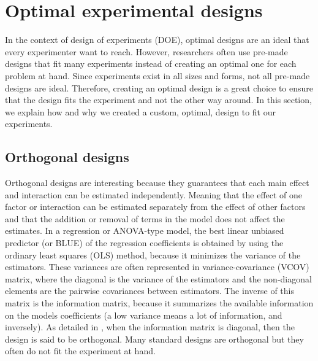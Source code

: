 
\section{Optimal experimental designs}
In the context of design of experiments (DOE), optimal designs are an ideal that every experimenter want to reach. However, researchers often use pre-made designs that fit many experiments instead of creating an optimal one for each problem at hand. Since experiments exist in all sizes and forms, not all pre-made designs are ideal. Therefore, creating an optimal design is a great choice to ensure that the design fits the experiment and not the other way around. In this section, we explain how and why we created a custom, optimal, design to fit our experiments.

\subsection{Orthogonal designs}
Orthogonal designs are interesting because they guarantees that each main effect and interaction can 
be estimated independently. Meaning that the effect of one factor or interaction can be estimated separately from the effect of 
other factors
and that the addition or removal of terms in the model does not affect the estimates.
In a regression or ANOVA-type model, the best linear unbiased predictor (or BLUE) of the regression coefficients is obtained by 
using 
the ordinary least squares (OLS) method, because it minimizes the variance of the estimators. 
These variances are often represented in variance-covariance (VCOV) matrix, 
where the diagonal is the variance of the estimators and the non-diagonal elements are the pairwise covariances between 
estimators. 
The inverse of this matrix is the information matrix, 
because it summarizes the available information  on the models coefficients (a low variance means a lot of information, and 
inversely).
As detailed in \textcite{goos_optimal_2011}, when the information matrix is diagonal, then the design is said to be orthogonal. Many standard designs are orthogonal but they often do not fit the experiment at hand.

